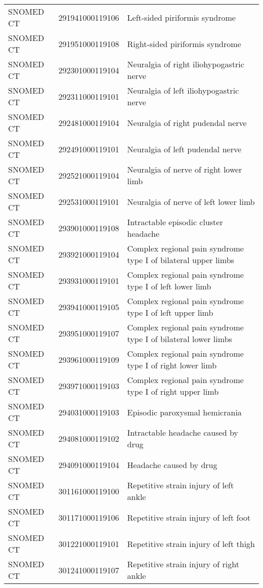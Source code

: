 \begin{longtable}{p{}p{}p{}}
  SNOMED CT & 291941000119106 & Left-sided piriformis syndrome \\ 
  SNOMED CT & 291951000119108 & Right-sided piriformis syndrome \\ 
  SNOMED CT & 292301000119104 & Neuralgia of right iliohypogastric nerve \\ 
  SNOMED CT & 292311000119101 & Neuralgia of left iliohypogastric nerve \\ 
  SNOMED CT & 292481000119104 & Neuralgia of right pudendal nerve \\ 
  SNOMED CT & 292491000119101 & Neuralgia of left pudendal nerve \\ 
  SNOMED CT & 292521000119104 & Neuralgia of nerve of right lower limb \\ 
  SNOMED CT & 292531000119101 & Neuralgia of nerve of left lower limb \\ 
  SNOMED CT & 293901000119108 & Intractable episodic cluster headache \\ 
  SNOMED CT & 293921000119104 & Complex regional pain syndrome type I of bilateral upper limbs \\ 
  SNOMED CT & 293931000119101 & Complex regional pain syndrome type I of left lower limb \\ 
  SNOMED CT & 293941000119105 & Complex regional pain syndrome type I of left upper limb \\ 
  SNOMED CT & 293951000119107 & Complex regional pain syndrome type I of bilateral lower limbs \\ 
  SNOMED CT & 293961000119109 & Complex regional pain syndrome type I of right lower limb \\ 
  SNOMED CT & 293971000119103 & Complex regional pain syndrome type I of right upper limb \\ 
  SNOMED CT & 294031000119103 & Episodic paroxysmal hemicrania \\ 
  SNOMED CT & 294081000119102 & Intractable headache caused by drug \\ 
  SNOMED CT & 294091000119104 & Headache caused by drug \\ 
  SNOMED CT & 301161000119100 & Repetitive strain injury of left ankle \\ 
  SNOMED CT & 301171000119106 & Repetitive strain injury of left foot \\ 
  SNOMED CT & 301221000119101 & Repetitive strain injury of left thigh \\ 
  SNOMED CT & 301241000119107 & Repetitive strain injury of right ankle \\ 

\end{longtable}
